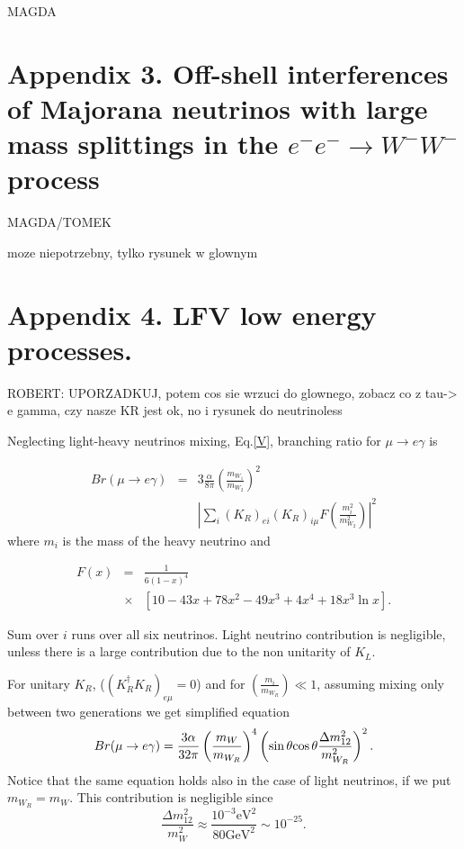 \documentclass[twocolumn,superscriptaddress,showpacs,prl,nofootinbib,floatfix]{revtex4}
\begin{document}

MAGDA

\section{Appendix 3. Off-shell interferences of Majorana neutrinos with large mass splittings in the $e^-e^- \to W^-W^-$ process  \label{appll}}

MAGDA/TOMEK

moze niepotrzebny, tylko rysunek w glownym

\section{Appendix 4. LFV low energy processes.   \label{applfv}}

ROBERT: UPORZADKUJ, potem cos sie wrzuci do glownego, zobacz co z tau-> e gamma, czy nasze KR jest ok, no i rysunek do neutrinoless

Neglecting light-heavy neutrinos mixing, Eq.\ref{V}, branching ratio for $\mu\rightarrow e\gamma$ is \cite{Bu:2008fx}

\begin{eqnarray}
Br(\mu  \rightarrow  e\gamma) &=& 3 \frac{\alpha}{8\pi} \left(\frac{m_{W_{1}}}{m_{W_{2}}}\right)^{2}   \nonumber \\ 
&  & \left|  \sum_{i} \left(K_{R}^{}\right)_{ei}\left(K_{R}^{}\right)_{i\mu}F\left(\frac{m_{i}^{2}}{m_{W_{2}}^{2}}  \right)  \right|^{2}
\end{eqnarray}
where $m_{i}$ is the mass of the heavy neutrino and  

\begin{eqnarray}
F(x)&=&\frac{1}{6\left(1-x\right)^{4}} \nonumber \\
&\times & \left[10-43x+78x^{2}-49x^{3}+4x^{4}+18x^{3}\ln x\right].
\end{eqnarray}

Sum over $i$ runs over all six neutrinos. Light neutrino contribution
is negligible, unless there is a large contribution due to the non
unitarity of $K_{L}$. 

For unitary $K_{R}$, ($\left(K_{R}^{\dagger}K_{R}\right)_{e\mu}=0$)
and for $\left(\frac{m_{i}}{m_{W_{R}}}\right)\ll1$, assuming mixing
only between two generations we get simplified equation
\begin{equation}
Br(\mu\rightarrow e\gamma)=\frac{3\alpha}{32\pi}\left(\frac{m_{W}}{m_{W_{R}}}\right)^{4}\left(\sin\theta\mbox{\ensuremath{\cos\theta}}\frac{\Delta m_{12}^{2}}{m_{W_{R}}^{2}}\right)^{2}.\label{eq:mu2egamma}
\end{equation}
Notice that the same equation holds also in the case of light neutrinos,
if we put $m_{W_{R}}=m_{W}$. This contribution is negligible since
\[
\frac{\Delta m_{12}^{2}}{m_{W}^{2}}\approx\frac{10^{-3}\text{{eV}}^{2}}{80\text{{GeV}}^{2}}\sim10^{-25}.
\]
\end{document}
